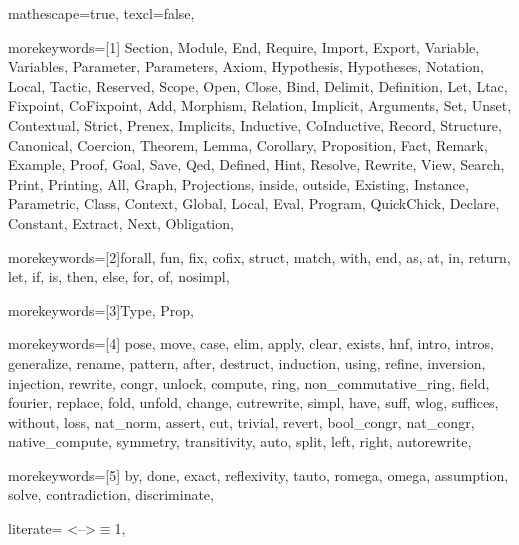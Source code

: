 
 {

mathescape=true,						
texcl=false,


morekeywords=[1]{
Section, Module, End, Require, Import, Export,
Variable, Variables, Parameter, Parameters, Axiom, Hypothesis, Hypotheses,
Notation, Local, Tactic, Reserved, Scope, Open, Close, Bind, Delimit,
Definition, Let, Ltac, Fixpoint, CoFixpoint, Add, Morphism, Relation,
Implicit, Arguments, Set, Unset, Contextual, Strict, Prenex, Implicits,
Inductive, CoInductive, Record, Structure, Canonical, Coercion,
Theorem, Lemma, Corollary, Proposition, Fact, Remark, Example,
Proof, Goal, Save, Qed, Defined, Hint, Resolve, Rewrite, View,
Search, Print, Printing, All, Graph, Projections, inside, outside,
Existing, Instance, Parametric, Class, Context, Global, Local, Eval,
Program, QuickChick, Declare, Constant, Extract, Next, Obligation},

morekeywords=[2]{forall, fun, fix, cofix, struct,
      match, with, end, as, at, in, return, let, if, is, then, else,
      for, of, nosimpl},

morekeywords=[3]{Type, Prop},

morekeywords=[4]{
         pose, move, case, elim, apply, clear, exists,
            hnf, intro, intros, generalize, rename, pattern, after,
	    destruct, induction, using, refine, inversion, injection,
         rewrite, congr, unlock, compute, ring, non_commutative_ring, field, fourier, 
            replace, fold, unfold, change, cutrewrite, simpl,
         have, suff, wlog, suffices, without, loss, nat_norm,
            assert, cut, trivial, revert, bool_congr, nat_congr, native_compute,
	 symmetry, transitivity, auto, split, left, right, autorewrite},        

morekeywords=[5]{
         by, done, exact, reflexivity, tauto, romega, omega,
         assumption, solve, contradiction, discriminate},



literate=	
{<-->}{{$\equiv$}}1,

}
